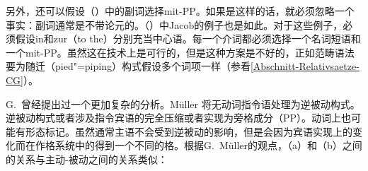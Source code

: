 \begin{exe}
\begin{xlist}[iv.]
\begin{exe}
\begin{xlist}[iv.]
另外，还可以假设（）中的副词选择mit-PP。如果是这样的话，就必须忽略一个事实：副词通常是不带论元的。（）中Jacob的例子也是如此。对于这些例子，必须假设in和zur（to the）分别充当中心语。每一个介词都必须选择一个名词短语和一个mit-PP。虽然这在技术上是可行的，但是这种方案是不好的，正如范畴语法要为随迁（pied"=piping）构式假设多个词项一样（参看\ref{Abschnitt-Relativsaetze-CG}）。

G.\ \citet{GMueller2009a}曾经提出过一个更加复杂的分析。Müller 将无动词指令语处理为逆被动构式。逆被动构式或者涉及指令宾语的完全压缩或者实现为旁格成分（PP）。动词上也可能有形态标记。虽然通常主语不会受到逆被动的影响，但是会因为宾语实现上的变化而在作格系统中的得到一个不同的格。根据G.\ Müller的观点，（a）和（b）之间的关系与主动-被动之间的关系类似：


\end{xlist}
\end{exe}
\end{xlist}
\end{exe}
